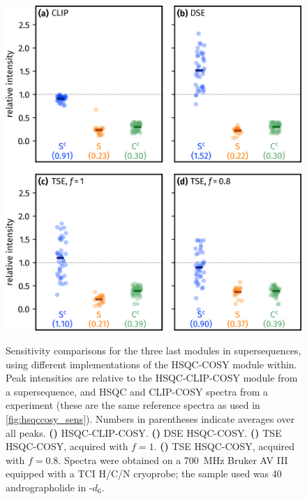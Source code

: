 \documentclass[a4paper,12pt]{article}
\newcommand{\andro}{Spectra were obtained on a \SI{700}{\MHz} Bruker AV III equipped with a TCI H/C/N cryoprobe; the sample used was \SI{40}{\milli\molar} andrographolide in \ch{DMSO}-$d_6$.}
\begin{document}
\begin{refsection}
\begin{figure}[!ht]
    \centering
    \includegraphics[]{hsqccosy_sens_with_hmbc.png}%
    {\label{fig:hsqccosy_sens_with_hmbc_clip}}%
    {\label{fig:hsqccosy_sens_with_hmbc_dse}}%
    {\label{fig:hsqccosy_sens_with_hmbc_tse_1}}%
    {\label{fig:hsqccosy_sens_with_hmbc_tse_0p8}}%
    \caption[Sensitivity comparisons for  supersequences]{
        Sensitivity comparisons for the three last modules in  supersequences, using different implementations of the HSQC-COSY module within.
        Peak intensities are relative to the HSQC-CLIP-COSY module from a  supersequence, and HSQC and CLIP-COSY spectra from a  experiment (these are the same reference spectra as used in \cref{fig:hsqccosy_sens}).
        Numbers in parentheses indicate averages over all peaks.
        \textbf{()} HSQC-CLIP-COSY.
        \textbf{()} DSE HSQC-COSY.
        \textbf{()} TSE HSQC-COSY, acquired with $f = 1$.
        \textbf{()} TSE HSQC-COSY, acquired with $f = 0.8$.
        \andro{}
    }
    \label{fig:hsqccosy_sens_with_hmbc}
\end{figure}


\end{refsection}
\end{document}
